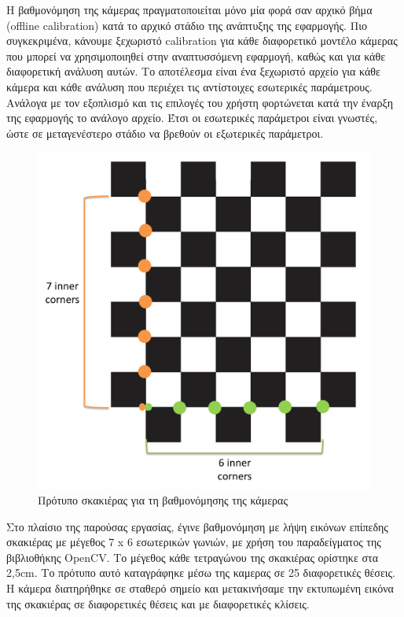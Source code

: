 Η βαθμονόμηση της κάμερας πραγματοποιείται μόνο μία φορά σαν αρχικό βήμα (offline calibration) κατά το αρχικό στάδιο της ανάπτυξης της εφαρμογής. Πιο συγκεκριμένα, κάνουμε ξεχωριστό calibration για κάθε διαφορετικό μοντέλο κάμερας που μπορεί να χρησιμοποιηθεί στην αναπτυσσόμενη εφαρμογή, καθώς και για κάθε διαφορετική ανάλυση αυτών. Το αποτέλεσμα είναι ένα ξεχωριστό αρχείο για κάθε κάμερα και κάθε ανάλυση που περιέχει τις αντίστοιχες εσωτερικές παράμετρους. Ανάλογα με τον εξοπλισμό και τις επιλογές του χρήστη φορτώνεται κατά την έναρξη της εφαρμογής το ανάλογο αρχείο. Έτσι οι εσωτερικές παράμετροι είναι γνωστές, ώστε σε μεταγενέστερο στάδιο να βρεθούν οι εξωτερικές παράμετροι.



\begin{figure}[H]
    \centering
    \includegraphics[scale=0.4, angle=0]{Files/Figures/pattern.png}
    \caption[Πρότυπο σκακιέρας για τη βαθμονόμησης της κάμερας]{Πρότυπο σκακιέρας για τη βαθμονόμησης της κάμερας}
    \label{fig:pattern}
\end{figure}






Στο πλαίσιο της παρούσας εργασίας, έγινε βαθμονόμηση με λήψη εικόνων επίπεδης σκακιέρας με μέγεθος 7 x 6 εσωτερικών γωνιών, με χρήση του παραδείγματος της βιβλιοθήκης OpenCV. Το μέγεθος κάθε τετραγώνου της σκακιέρας ορίστηκε στα 2,5cm. Το πρότυπο αυτό καταγράφηκε μέσω της καμερας σε 25 διαφορετικές θέσεις. Η κάμερα διατηρήθηκε σε σταθερό σημείο και μετακινήσαμε την εκτυπωμένη εικόνα της σκακιέρας σε διαφορετικές θέσεις και με διαφορετικές κλίσεις. 



